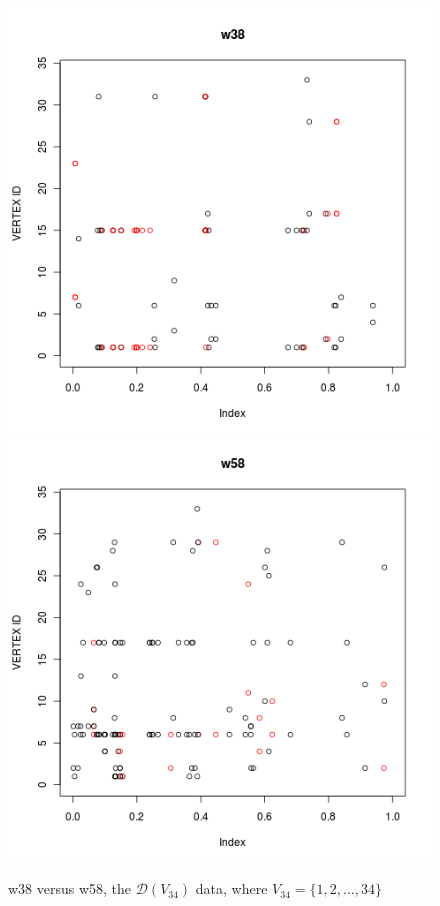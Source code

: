 \documentclass[12pt]{article}%
\begin{document}
\begin{figure}
\begin{center}
\includegraphics[scale=0.30]{v34_myDdata_w38.png}
\includegraphics[scale=0.30]{v34_myDdata_w58.png}
\end{center}
\caption{w38 versus w58, the $\mathcal D(V_{34})$ data, where $V_{34} =\{1,2,\ldots, 34\}$}
\label{theDplot}
\end{figure}
\end{document}
